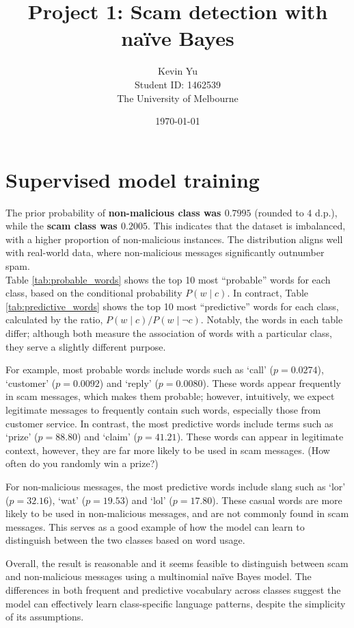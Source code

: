 \documentclass[a4paper,12pt]{article}
\title{Project 1: Scam detection with naïve Bayes}
\author{Kevin Yu \\ Student ID: 1462539 \\ The University of Melbourne}
\date{\today}
\begin{document}
\maketitle

\newpage

\section{Supervised model training}

The prior probability of \textbf{non-malicious class was $0.7995$} (rounded to $4$ d.p.), while the \textbf{scam class was $0.2005$}. This indicates that the dataset is imbalanced, with a higher proportion of non-malicious instances. The distribution aligns well with real-world data, where non-malicious messages significantly outnumber spam. \\

Table \ref{tab:probable_words} shows the top 10 most ``probable'' words for each class, based on the conditional probability $P(w \mid c)$. In contract, Table \ref{tab:predictive_words} shows the top 10 most ``predictive'' words for each class, calculated by the ratio, $P(w \mid c) / P(w \mid \neg c)$. Notably, the words in each table differ; although both measure the association of words with a particular class, they serve a slightly different purpose. 

For example, most probable words include words such as `call' ($p = 0.0274$), `customer' ($p = 0.0092$) and `reply' ($p = 0.0080$). These words appear frequently in scam messages, which makes them probable; however, intuitively, we expect legitimate messages to frequently contain such words, especially those from customer service. In contrast, the most predictive words include terms such as `prize' ($p = 88.80$) and `claim' ($p = 41.21$). These words can appear in legitimate context, however, they are far more likely to be used in scam messages. (How often do you randomly win a prize?) 

For non-malicious messages, the most predictive words include slang such as `lor' ($p = 32.16$), `wat' ($p = 19.53$) and `lol' ($p = 17.80$). These casual words are more likely to be used in non-malicious messages, and are not commonly found in scam messages. This serves as a good example of how the model can learn to distinguish between the two classes based on word usage.

Overall, the result is reasonable and it seems feasible to distinguish between scam and non-malicious messages using a multinomial naïve Bayes model. The differences in both frequent and predictive vocabulary across classes suggest the model can effectively learn class-specific language patterns, despite the simplicity of its assumptions.
\end{document}

